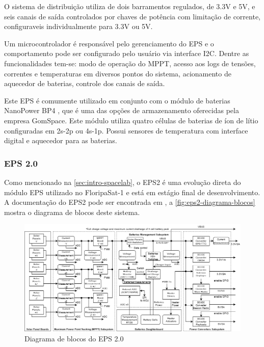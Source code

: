 O sistema de distribuição utiliza de dois barramentos regulados, de 3.3V e 5V, e seis canais de saída controlados por chaves de potência com limitação de corrente, configuraveis individualmente para 3.3V ou 5V.

Um microcontrolador é responsável pelo gerenciamento do \gls{EPS} e o comportamento pode ser configurado pelo usuário via interface \gls{I2C}.
Dentre as funcionalidades tem-se: modo de operação do \gls{MPPT}, acesso aos logs de tensões, correntes e temperaturas em diversos pontos do sistema, acionamento de aquecedor de baterias, controle dos canais de saída.

Este EPS é comumente utilizado em conjunto com o módulo de baterias NanoPower BP4 \cite{bp4-datasheet}, que é uma das opções de armazenamento oferecidas pela empresa GomSpace.
Este módulo utiliza quatro células de baterias de íon de lítio configuradas em 2s-2p ou 4s-1p. Possui sensores de temperatura com interface digital e aquecedor para as baterias.



\subsubsection{EPS 2.0}

Como mencionado na \autoref{sec:intro-spacelab}, o \gls{EPS2} é uma evolução direta do módulo \gls{EPS} utilizado no FloripaSat-1 \cite{floripasat-1} e está em estágio final de desenvolvimento. A documentação do \gls{EPS2} pode ser encontrada em \cite{eps2-doc}, a \autoref{fig:eps2-diagrama-blocos} mostra o diagrama de blocos deste sistema.

\begin{figure}[htp]
    \caption{Diagrama de blocos do EPS 2.0}
    \begin{center}
        \includegraphics[width=\textwidth, keepaspectratio]{images/eps2-power-diagram.png}
    \end{center}
    \label{fig:eps2-diagrama-blocos}
\end{figure}

